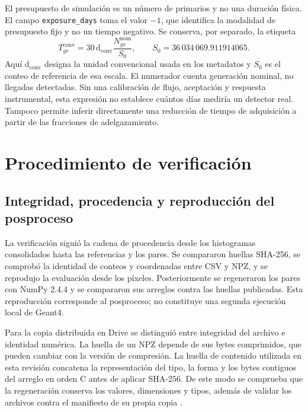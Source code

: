\documentclass[11pt,a4paper]{article}
\begin{document}
El presupuesto de simulación es un número de primarios y no una duración física. El campo \texttt{exposure\_days} toma el valor $-1$, que identifica la modalidad de presupuesto fijo y no un tiempo negativo. Se conserva, por separado, la etiqueta
\begin{equation}
 T^{\mathrm{conv}}_{gv}=30\,\mathrm{d}_{\mathrm{conv}}
 \frac{N^{\mathrm{nom}}_{gv}}{S_0},\qquad
 S_0=36\,034\,069.911914065.
 \label{eq:exposicion}
\end{equation}
Aquí $\mathrm{d}_{\mathrm{conv}}$ designa la unidad convencional usada en los metadatos y $S_0$ es el conteo de referencia de esa escala. El numerador cuenta generación nominal, no llegadas detectadas. Sin una calibración de flujo, aceptación y respuesta instrumental, esta expresión no establece cuántos días mediría un detector real. Tampoco permite inferir directamente una reducción de tiempo de adquisición a partir de las fracciones de adelgazamiento.

\section{Procedimiento de verificación}

\subsection{Integridad, procedencia y reproducción del posproceso}

La verificación siguió la cadena de procedencia desde los histogramas consolidados hasta las referencias y los pares. Se compararon huellas SHA-256, se comprobó la identidad de conteos y coordenadas entre CSV y NPZ, y se reprodujo la evaluación desde los píxeles. Posteriormente se regeneraron los pares con NumPy 2.4.4 y se compararon sus arreglos contra las huellas publicadas. Esta reproducción corresponde al posproceso; no constituye una segunda ejecución local de Geant4.

Para la copia distribuida en Drive se distinguió entre integridad del archivo e identidad numérica. La huella de un NPZ depende de sus bytes comprimidos, que pueden cambiar con la versión de compresión. La huella de contenido utilizada en esta revisión concatena la representación del tipo, la forma y los bytes contiguos del arreglo en orden C antes de aplicar SHA-256. De este modo se comprueba que la regeneración conserva los valores, dimensiones y tipos, además de validar los archivos contra el manifiesto de su propia copia \cite{drive}.
\end{document}
